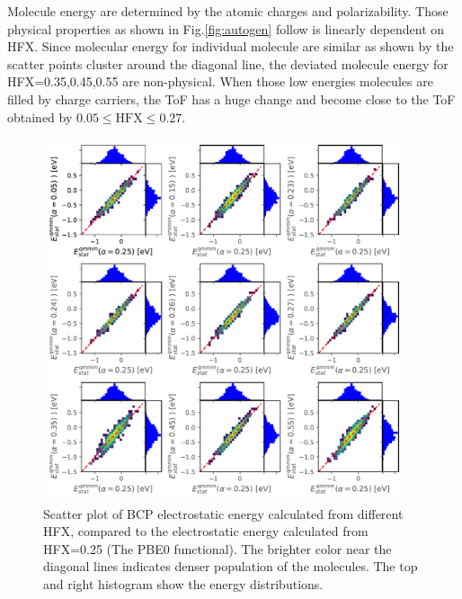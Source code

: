 \documentclass[letterpaper,12pt]{article}
\begin{document}
Molecule energy are determined by the atomic charges and polarizability. Those physical properties as shown in Fig.\ref{fig:autogen} follow is linearly dependent on HFX. Since molecular energy for individual molecule are similar as shown by the scatter points cluster around the diagonal line, the deviated molecule energy for HFX=0.35,0.45,0.55 are non-physical. 
When those low energies molecules are filled by charge carriers, the ToF has a huge change and become close to the ToF obtained by $0.05 \leq \text{HFX} \leq 0.27$.

\begin{figure}[H]
    \centering
    \includegraphics[width=0.95\textwidth]{figs/BCP_HFX/scatterEstat_qmmm.pdf}
    \caption{Scatter plot of BCP electrostatic energy calculated from different HFX, compared to the electrostatic energy calculated from HFX=0.25 (The PBE0 functional). The brighter color near the diagonal lines indicates denser population of the molecules.  The top and right histogram show the energy distributions.}
    \label{fig:Estat_qmmm_BCP}
\end{figure}
\end{document}
